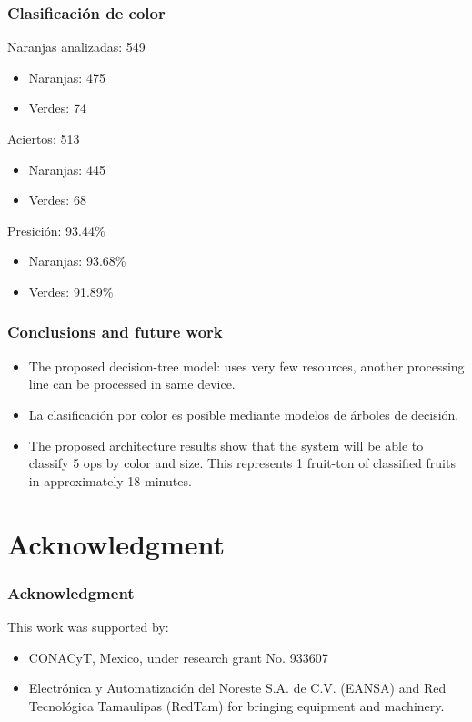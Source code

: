\documentclass[
serif,
compress,
xcolor=table,
dvipsnames,
]{beamer}
\begin{document}
\begin{frame}
	\frametitle{Clasificación de color}
	
Naranjas analizadas: 549
\begin{itemize}
	\item Naranjas: 475
	\item Verdes: 74
\end{itemize}


Aciertos: 513
\begin{itemize}
	\item Naranjas: 445
	\item Verdes: 68
\end{itemize}


Presición: 93.44\%
\begin{itemize}
	\item Naranjas: 93.68\%
	\item Verdes: 91.89\%
\end{itemize}


	
\end{frame}



\begin{frame}
\frametitle{Conclusions and future work}

\begin{itemize}

\item The proposed decision-tree model: uses very few resources, another processing line can be processed in same device.

\item La clasificación por color es posible mediante modelos de árboles de decisión.

\item The proposed architecture results show that the system will be able to classify 5 ops by color and size. This represents 1 fruit-ton of classified fruits in approximately 18 minutes.
\end{itemize}

\end{frame}


\section{Acknowledgment}
\begin{frame}
\frametitle{Acknowledgment}
This work was supported by:

\begin{itemize}
\item CONACyT, Mexico, under research grant No. 933607
\item Electrónica y Automatización del Noreste S.A. de C.V. (EANSA)  and Red Tecnológica Tamaulipas (RedTam) for bringing equipment and machinery. \\

\end{itemize}



\end{frame}


% 
\end{document}
